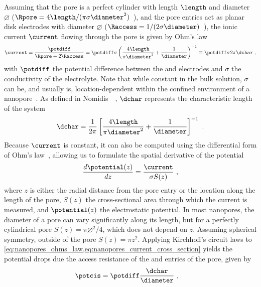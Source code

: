 Assuming that the pore is a perfect cylinder with length $\length$ and diameter $\diameter$ ($\Rpore = 4
\length / (\pi \sigma \diameter^2)$~\cite{Grosberg-2010}), and the pore entries act as planar disk electrodes
with diameter $\diameter$ ($\Raccess = 1 / (2\sigma\diameter)$~\cite{Hall-1975}), the ionic current $\current$
flowing through the pore is given by Ohm's law~\cite{Kowalczyk-2011}
%
\begin{equation}\label{eq:nanopores_ohms_law}
  \current = \dfrac{\potdiff}{\Rpore + 2 \Raccess} 
           = \potdiff \sigma \left( \dfrac{4 \length}{\pi \diameter^2} + \dfrac{1}{\diameter} \right)^{-1}
           \equiv \potdiff \sigma 2 \pi \dchar
  \text{ ,}
\end{equation}
%
with $\potdiff$ the potential difference between the \cisi{} and \transi{} electrodes and $\sigma$ the
conductivity of the electrolyte. Note that while constant in the bulk solution, $\sigma$ can be, and usually
is, location-dependent within the confined environment of a nanopore~\cite{Chinappi-2015}. As defined in
Nomidis~\etal{}~\cite{Nomidis-2018}, $\dchar$ represents the characteristic length of the system
%
\begin{equation}\label{eq:nanopores_characteristic_length}
  \dchar = \dfrac{1}{2\pi} \left[\dfrac{4 \length}{\pi\diameter^2} + \dfrac{1}{\diameter} \right]^{-1}
  \text{ .}
\end{equation}
%
Because $\current$ is constant, it can also be computed using the differential form of Ohm's
law~\cite{Chinappi-2015}, allowing us to formulate the spatial derivative of the potential
%
\begin{equation}\label{eq:nanopores_current_cross_section}
  \dfrac{d \potential(z)}{dz} = \dfrac{\current}{\sigma S(z)}
  \text{ ,}
\end{equation}
%
where $z$ is either the radial distance from the pore entry or the location along the length of the pore,
$S(z)$ the cross-sectional area through which the current is measured, and $\potential(z)$ the electrostatic
potential. In most nanopores, the diameter of a pore can vary significantly along its length, but for a
perfectly cylindrical pore $S(z) = \pi \diameter^2 / 4$, which does not depend on $z$. Assuming spherical
symmetry, outside of the pore $S(z) = \pi z^2$. Applying Kirchhoff's circuit laws to
\cref{eq:nanopores_ohms_law,eq:nanopores_current_cross_section} yields the potential drops due the access
resistance of the \cisi{} and \transi{} entries of the pore, given by
%
\begin{align}\label{eq:nanopores_potcis}
  \potcis   ={}& \potdiff \dfrac{\dchar}{\diameter}
  \text{ ,}
\end{align}

